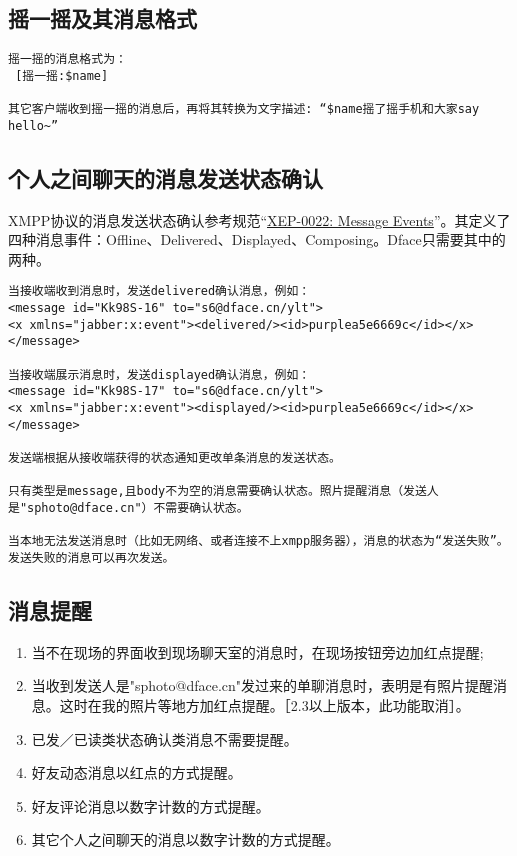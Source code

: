 \subsection{摇一摇及其消息格式}

\begin{verbatim}
摇一摇的消息格式为：
 [摇一摇:$name]

其它客户端收到摇一摇的消息后，再将其转换为文字描述: “$name摇了摇手机和大家say hello~”
\end{verbatim}



\subsection{个人之间聊天的消息发送状态确认}
XMPP协议的消息发送状态确认参考规范“\href{http://xmpp.org/extensions/xep-0022.html}{XEP-0022: Message Events}”。其定义了四种消息事件：Offline、Delivered、Displayed、Composing。Dface只需要其中的两种。

\begin{verbatim}
当接收端收到消息时，发送delivered确认消息，例如：
<message id="Kk98S-16" to="s6@dface.cn/ylt">
<x xmlns="jabber:x:event"><delivered/><id>purplea5e6669c</id></x>
</message>

当接收端展示消息时，发送displayed确认消息，例如：
<message id="Kk98S-17" to="s6@dface.cn/ylt">
<x xmlns="jabber:x:event"><displayed/><id>purplea5e6669c</id></x>
</message>

发送端根据从接收端获得的状态通知更改单条消息的发送状态。

只有类型是message,且body不为空的消息需要确认状态。照片提醒消息（发送人是"sphoto@dface.cn"）不需要确认状态。

当本地无法发送消息时（比如无网络、或者连接不上xmpp服务器），消息的状态为“发送失败”。发送失败的消息可以再次发送。

\end{verbatim}

\subsection{消息提醒}
\begin{enumerate}
\item 当不在现场的界面收到现场聊天室的消息时，在现场按钮旁边加红点提醒;
\item 当收到发送人是"sphoto@dface.cn"发过来的单聊消息时，表明是有照片提醒消息。这时在我的照片等地方加红点提醒。［2.3以上版本，此功能取消］。
\item 已发／已读类状态确认类消息不需要提醒。
\item 好友动态消息以红点的方式提醒。
\item 好友评论消息以数字计数的方式提醒。
\item 其它个人之间聊天的消息以数字计数的方式提醒。
\end{enumerate}


